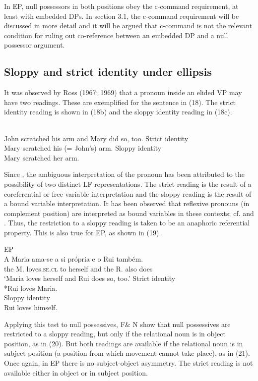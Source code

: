\documentclass[output=paper]{langsci/langscibook}
\begin{document}
In EP, null possessors in both positions obey the c-command requirement, at least with embedded DPs. In section 3.1, the c-command requirement will be discussed in more detail and it will be argued that c-command is not the relevant condition for ruling out co-reference between an embedded DP and a null possessor argument.

\subsection{Sloppy and strict identity under ellipsis}%

It was observed by Ross (1967; 1969) that a pronoun inside an elided VP may have two readings. These are exemplified for the sentence in (18). The strict identity reading is shown in (18b) and the sloppy identity reading in (18c).

\ea%
\citep[207]{Ross1967}\label{ex:wein:18}\\
\ea John scratched his arm and Mary did so, too.
\ex Strict identity\\Mary scratched his (= John’s) arm.
\ex Sloppy identity\\Mary scratched her arm.
\z
\z

Since \citet{Sag1980}, the ambiguous interpretation of the pronoun has been attributed to the possibility of two distinct LF representations. The strict reading is the result of a coreferential or free variable interpretation and the sloppy reading is the result of a bound variable interpretation. It has been observed that reflexive pronouns (in complement position) are interpreted as bound variables in these contexts; cf. \citet{Sag1980} and \citet{Hicks2009}. Thus, the restriction to a sloppy reading is taken to be an anaphoric referential property. This is also true for EP, as shown in (19).

\ea%
    EP\label{ex:wein:19}\\
    \ea \gll A Maria ama-se a si própria e o Rui também.\\
         the M. loves.\textsc{se.cl} to herself and the R. also does\\
    \glt ‘Maria loves herself and Rui does so, too.’
    \ex Strict identity\\
        *Rui loves Maria.\\
    \ex Sloppy identity\\
        Rui loves himself.
    \z
\z
          
Applying this test to null possessives, F\& N show that null possessives are restricted to a sloppy reading, but only if the relational noun is in object position, as in (20). But both readings are available if the relational noun is in subject position (a position from which movement cannot take place), as in (21). Once again, in EP there is no subject-object asymmetry. The strict reading is not available either in object or in subject position.
\end{document}
